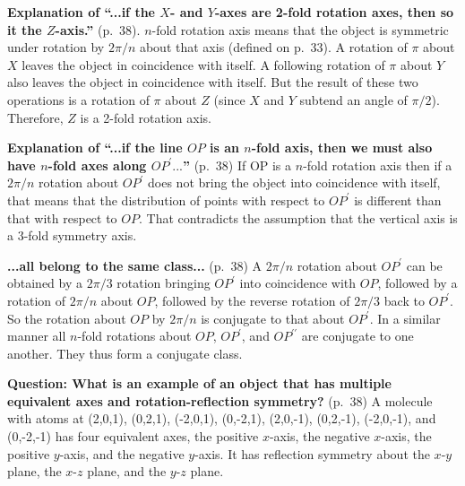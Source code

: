 {\bf Explanation of ``...if the $X$- and $Y$-axes are 2-fold rotation
  axes, then so it the $Z$-axis.''} (p.\ 38). $n$-fold rotation axis
means that the object is symmetric under rotation by $2\pi/n$ about
that axis (defined on p.\ 33).  A rotation of $\pi$ about $X$ leaves
the object in coincidence with itself. A following rotation of $\pi$
about $Y$ also leaves the object in coincidence with itself. But the
result of these two operations is a rotation of $\pi$ about $Z$ (since
$X$ and $Y$ subtend an angle of $\pi/2$). Therefore, $Z$ is a 2-fold
rotation axis.

{\bf Explanation of ``...if the line $OP$ is an $n$-fold axis, then we
  must also have $n$-fold axes along $OP^\prime...$''} (p.\ 38) If OP
is a $n$-fold rotation axis then if a $2\pi/n$ rotation about $OP^\prime$
does not bring the object into coincidence with itself, that means
that the distribution of points with respect to $OP^\prime$ is
different than that with respect to $OP$. That contradicts the
assumption that the vertical axis is a 3-fold symmetry axis.

{\bf ...all belong to the same class...} (p.\ 38) A $2\pi/n$ rotation about
$OP^\prime$ can be obtained by a $2\pi/3$ rotation bringing $OP^\prime$ into
coincidence with $OP$, followed by a rotation of $2\pi/n$ about $OP$,
followed by the reverse rotation of $2\pi/3$ back to $OP^\prime$. So the
rotation about $OP$ by $2\pi/n$ is conjugate to that about $OP^\prime$. In a
similar manner all $n$-fold rotations about $OP$, $OP^\prime$, and
$OP^{\prime\prime}$ are conjugate to one another. They thus form a
conjugate class.

{\bf Question: What is an example of an object that has multiple equivalent axes and rotation-reflection symmetry?} (p.\ 38)
A molecule with atoms at (2,0,1), (0,2,1), (-2,0,1), (0,-2,1), (2,0,-1), (0,2,-1), (-2,0,-1), and (0,-2,-1) has four equivalent axes, the positive $x$-axis, the negative $x$-axis, the positive $y$-axis, and the negative $y$-axis. It has reflection symmetry about the $x$-$y$ plane, the $x$-$z$ plane, and the $y$-$z$ plane.
